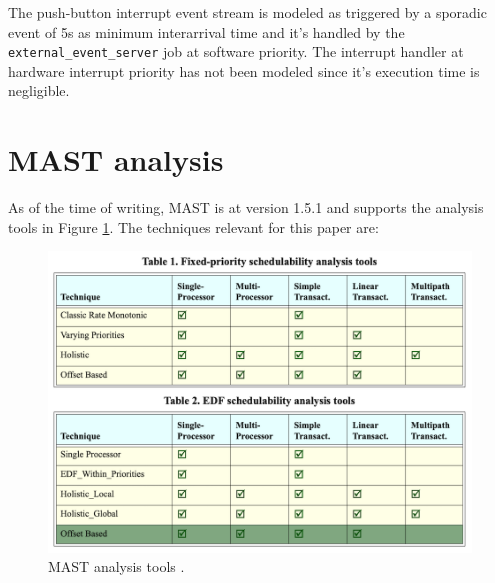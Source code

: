\documentclass{article}
\begin{document}
The push-button interrupt event stream is modeled as triggered by a sporadic event of 5s as minimum interarrival time and it's handled by the \texttt{external\_event\_server} job at software priority. The interrupt handler at hardware interrupt priority has not been modeled since it's execution time is negligible.

\section{MAST analysis}

As of the time of writing, MAST is at version 1.5.1 and supports the analysis tools \cite{mast-analysis} in Figure \ref{mast-analysis-tools}. The techniques relevant for this paper are:

\begin{figure}[!htbp]
\centering
\includegraphics[width=5in]{images/mast-analysis}
\caption{MAST analysis tools \cite{mast-analysis}.}
\label{mast-analysis-tools}
\end{figure}
\end{document}
